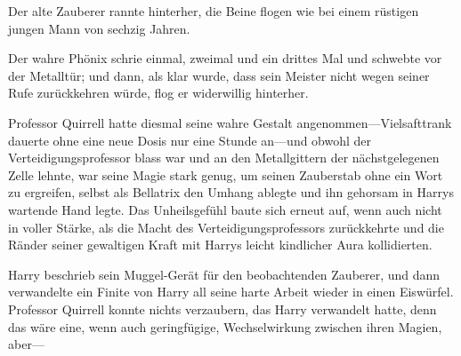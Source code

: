 Der alte Zauberer rannte hinterher, die Beine flogen wie bei einem rüstigen jungen Mann von sechzig Jahren.

Der wahre Phönix schrie einmal, zweimal und ein drittes Mal und schwebte vor der Metalltür; und dann, als klar wurde, dass sein Meister nicht wegen seiner Rufe zurückkehren würde, flog er widerwillig hinterher.

\later

Professor Quirrell hatte diesmal seine wahre Gestalt angenommen—Vielsafttrank dauerte ohne eine neue Dosis nur eine Stunde an—und obwohl der Verteidigungsprofessor blass war und an den Metallgittern der nächstgelegenen Zelle lehnte, war seine Magie stark genug, um seinen Zauberstab ohne ein Wort zu ergreifen, selbst als Bellatrix den Umhang ablegte und ihn gehorsam in Harrys wartende Hand legte. Das Unheilsgefühl baute sich erneut auf, wenn auch nicht in voller Stärke, als die Macht des Verteidigungsprofessors zurückkehrte und die Ränder seiner gewaltigen Kraft mit Harrys leicht kindlicher Aura kollidierten.

Harry beschrieb sein Muggel-Gerät für den beobachtenden Zauberer, und dann verwandelte ein Finite von Harry all seine harte Arbeit wieder in einen Eiswürfel. Professor Quirrell konnte nichts verzaubern, das Harry verwandelt hatte, denn das wäre eine, wenn auch geringfügige, Wechselwirkung zwischen ihren Magien, aber—

